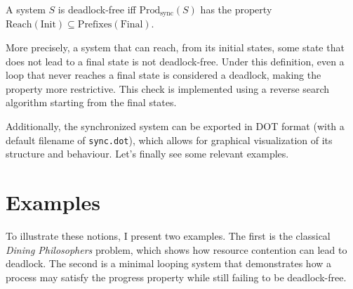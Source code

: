 \begin{definition}
	A system $S$ is deadlock-free iff
    $\text{Prod}_{\text{sync}}(S)$ has the property
	$\text{Reach}(\text{Init})\subseteq \text{Prefixes}(\text{Final})$.
\end{definition}


More precisely, a system that can reach, from its initial states, some state
that does not lead to a final state is not deadlock-free. Under this definition,
even a loop that never reaches a final state is considered a deadlock,
making the property more restrictive. This check is implemented using a
reverse search algorithm starting from the final states.


Additionally, the synchronized system can be exported in DOT format
(with a default filename of \verb|sync.dot|), which allows for graphical 
visualization of its structure and behaviour.
Let's finally see some relevant examples.


\section{Examples}

To illustrate these notions, I present two examples. The first is the
classical \emph{Dining Philosophers} problem, which shows how resource
contention can lead to deadlock. The second is a minimal looping system
that demonstrates how a process may satisfy the progress property while
still failing to be deadlock-free.

